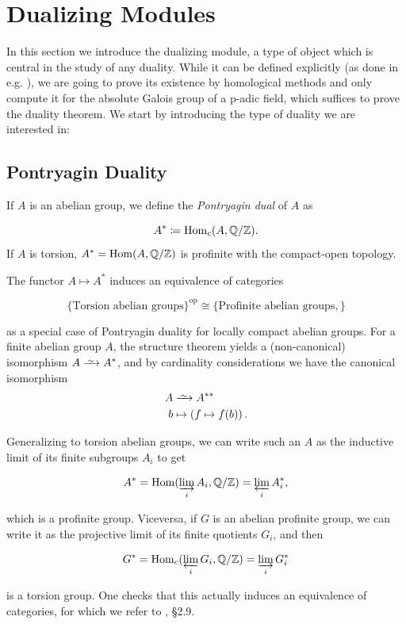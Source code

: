 \documentclass[a4paper, oneside]{memoir}
\begin{document}
\section{Dualizing Modules}

In this section we introduce the dualizing module, a type of object which is central in the study of any duality. While it can be defined explicitly (as done in e.g. \cite{Neukirch}),
we are going to prove its existence by homological methods and only compute it for the absolute Galois group of a p-adic field, which suffices to prove the duality theorem. We
start by introducing the type of duality we are interested in:

\subsection{Pontryagin Duality}

If \(A\) is an abelian group, we define the \textit{Pontryagin dual} of \(A\) as

\[
	A^*\coloneqq \operatorname{Hom}_{c}(A,\mathbb{Q}/\mathbb{Z})
	.\]
If \(A\) is torsion, \(A^*=\operatorname{Hom}(A,\mathbb{Q}/\mathbb{Z})\) is profinite with the compact-open topology.

\begin{remark}\label{rm:Pontryagin}
	The functor \(A\mapsto A^*\)  induces an equivalence of categories

	\[
		\{ \text{Torsion abelian groups} \}^{\text{op}}  \cong \{ \text{Profinite abelian groups}, \}
	\]

	as a special case of Pontryagin duality for locally compact abelian groups.
	For a finite abelian group \(A\), the structure theorem yields a (non-canonical) isomorphism \(A\Iso A^*\), and by cardinality considerations we have the canonical isomorphism
	\begin{align*}
		A & \Iso A^{**}                           \\
		b & \mapsto \left( f\mapsto f(b) \right).
	\end{align*}

	Generalizing to torsion abelian groups, we can write such an \(A\) as the inductive limit of its finite subgroups \(A_i\) to get

	\[
		A^* = \operatorname{Hom}(\varinjlim_i A_i,\mathbb{Q}/\mathbb{Z}) = \varprojlim_i A_i^*,
	\]

	which is a profinite group. Viceversa, if \(G\) is an abelian profinite group, we can write it as the projective limit of its finite quotients \(G_i\), and then

	\[
		G^* = \operatorname{Hom}_{c}( \varprojlim_i G_i,\mathbb{Q}/\mathbb{Z} ) = \varinjlim_i G_i^*
	\]

	is a torsion group. One checks that this actually induces an equivalence of categories, for which we refer to \cite{RibesZalesskii}, \S 2.9.
\end{remark}
\end{document}
